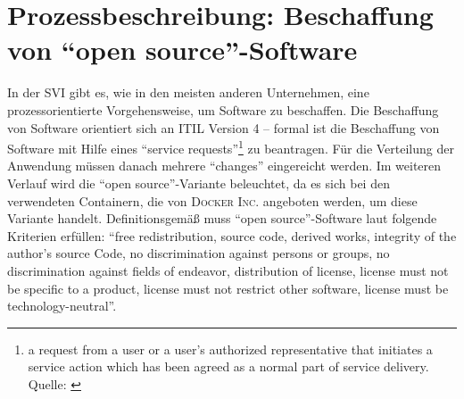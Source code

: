 \section{Prozessbeschreibung: Beschaffung von \enquote{open source}-Software}
In der \ac{SVI} gibt es, wie in den meisten anderen Unternehmen, eine prozessorientierte Vorgehensweise, um Software zu beschaffen. Die Beschaffung von Software orientiert sich an \ac{ITIL} Version 4 -- formal ist die Beschaffung von Software mit Hilfe eines \enquote{service requests}\footnote{a request from a user or a user's authorized representative that initiates a service action which has been agreed as a normal part of service delivery. Quelle: \cite[][S.195]{axelos_limited_itil_2019}} zu beantragen. Für die Verteilung der Anwendung müssen danach mehrere \enquote{changes} eingereicht werden. Im weiteren Verlauf wird die \enquote{open source}-Variante beleuchtet, da es sich bei den verwendeten Containern, die von \textsc{Docker Inc.} angeboten werden, um diese Variante handelt. Definitionsgemäß muss \enquote{open source}-Software laut \cite{opensourceorg_open_2020} folgende Kriterien erfüllen: \enquote{free redistribution, source code, derived works, integrity of the author's source Code, no discrimination against persons or groups, no discrimination against fields of endeavor, distribution of license, license must not be specific to a product, license must not restrict other software, license must be technology-neutral}. \par
